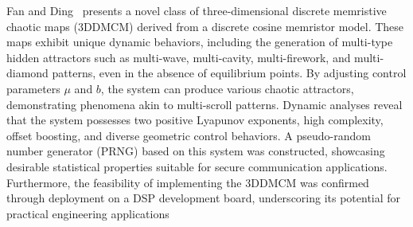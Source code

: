 Fan and Ding~\cite{Fan2025} presents a novel class of three-dimensional discrete memristive chaotic maps (3DDMCM) derived from a discrete cosine memristor model. These maps exhibit unique dynamic behaviors, including the generation of multi-type hidden attractors such as multi-wave, multi-cavity, multi-firework, and multi-diamond patterns, even in the absence of equilibrium points. By adjusting control parameters $\mu$ and $b$, the system can produce various chaotic attractors, demonstrating phenomena akin to multi-scroll patterns. Dynamic analyses reveal that the system possesses two positive Lyapunov exponents, high complexity, offset boosting, and diverse geometric control behaviors. A pseudo-random number generator (PRNG) based on this system was constructed, showcasing desirable statistical properties suitable for secure communication applications. Furthermore, the feasibility of implementing the 3DDMCM was confirmed through deployment on a DSP development board, underscoring its potential for practical engineering applications






